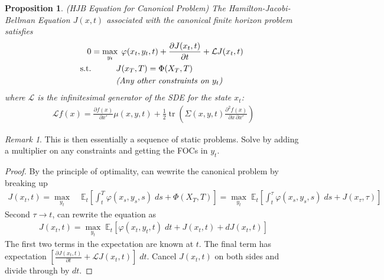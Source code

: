 \documentclass[12pt]{book}
\numberwithin{equation}{section} %
\theoremstyle{plain}
\newtheorem{prop}[thm]{Proposition}
\theoremstyle{definition}
\theoremstyle{remark}
\newtheorem*{rmk}{Remark}
\newcommand{\ra}{\rightarrow}
\newcommand{\trace}{\operatorname{tr}}
\newcommand{\calL}{\mathcal{L}}
\newcommand{\E}{\mathbb{E}}
\begin{document}
\begin{prop}\emph{(HJB Equation for Canonical Problem)}
The \emph{Hamilton-Jacobi-Bellman Equation} $J(x,t)$ associated with the
canonical finite horizon problem satisfies
\begin{align*}
  0
  &=
  \max_{y_t}
  \;
  \varphi(x_t,y_t,t)
  +
  \frac{\partial J(x_t,t)}{\partial t}
  +
  \calL J(x_t,t)
  \\
  \qquad\text{s.t.}
  &
  \quad\qquad
  J(x_T,T)=\Phi(X_T,T)
  \\
  &
  \quad\qquad
  \text{\emph{(Any other constraints on $y_t$)}}
\end{align*}
where $\calL$ is the infinitesimal generator of the SDE for the state
$x_t$:
\begin{align*}
  \calL f(x)
  =
  \frac{\partial f(x)}{\partial x'}
  \mu(x,y,t)
  +
  \frac{1}{2}
  \trace\left(
  \Sigma(x,y,t)
  \frac{\partial^2 f(x)}{\partial x\,\partial x'}
  \right)
\end{align*}
\end{prop}
\begin{rmk}
This is then essentially a sequence of static problems.
Solve by adding a multiplier on any constraints and getting the FOCs in
$y_t$.
\end{rmk}
\begin{proof}
By the principle of optimality, can wewrite the canonical problem by
breaking up
\begin{align*}
  J(x_t,t)
  =
  \max_{y_t}
  \;&
  \E_t\left[
    \int_t^T
    \varphi(x_s,y_s,s)\;ds
    +
    \Phi(X_T,T)
  \right]
  =
  \max_{y_t}
  \;
  \E_t\left[
    \int_t^\tau
    \varphi(x_s,y_s,s)\;ds
    +
    J(x_\tau,\tau)
  \right]
\end{align*}
Second $\tau\ra t$, can rewrite the equation as
\begin{align*}
  J(x_t,t)
  =
  \max_{y_t}
  \;
  \E_t\left[
    \varphi(x_t,y_t,t)\;dt
    +
    J(x_t,t)
    +
    dJ(x_t,t)
  \right]
\end{align*}
The first two terms in the expectation are known at $t$. The final term
has expectation
$\left[\frac{\partial J(x_t,t)}{\partial t}+\calL J(x_t,t)\right]\;dt$.
Cancel $J(x_t,t)$ on both sides and divide through by $dt$.
\end{proof}
\end{document}
